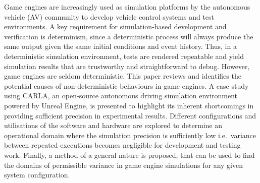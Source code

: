Game engines are increasingly used as simulation platforms by the autonomous vehicle (AV) community to develop vehicle control systems and test environments. A key requirement for simulation-based development and verification is determinism, since a deterministic process will always produce the same output given the same initial conditions and event history. Thus, in a deterministic simulation environment, tests are rendered repeatable and yield simulation results that are trustworthy and straightforward to debug. However, game engines are seldom deterministic. This paper reviews and identifies the potential causes of non-deterministic behaviours in game engines. A case study using CARLA, an open-source autonomous driving simulation environment powered by Unreal Engine, is presented to highlight its inherent shortcomings in providing sufficient precision in experimental results. Different configurations and utilisations of the software and hardware are explored to determine an operational domain where the simulation precision is sufficiently low i.e.\ variance between repeated executions becomes negligible for development and testing work. Finally, a method of a general nature is proposed, that can be used to find the domains of permissible variance in game engine simulations for any given system configuration.